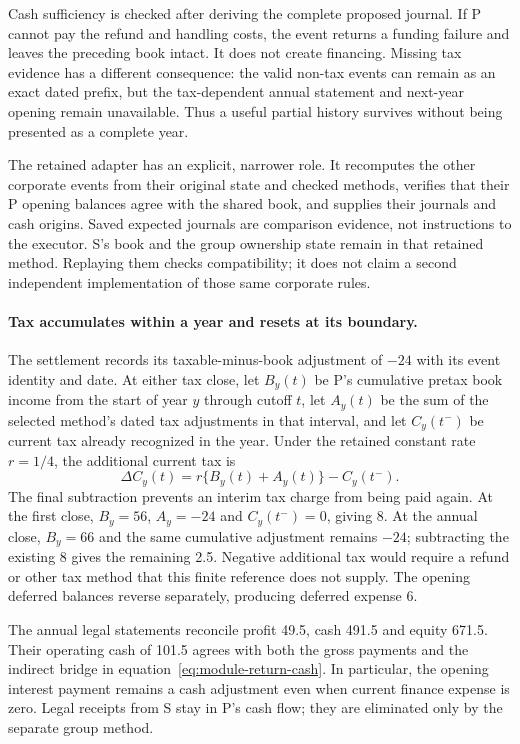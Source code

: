 Cash sufficiency is checked after deriving the complete proposed journal.
If P cannot pay the refund and handling costs, the event returns a funding
failure and leaves the preceding book intact. It does not create financing.
Missing tax evidence has a different consequence: the valid non-tax events
can remain as an exact dated prefix, but the tax-dependent annual statement
and next-year opening remain unavailable. Thus a useful partial history
survives without being presented as a complete year.

The retained adapter has an explicit, narrower role. It recomputes the other
corporate events from their original state and checked methods, verifies that
their P opening balances agree with the shared book, and supplies their
journals and cash origins. Saved expected journals are comparison evidence,
not instructions to the executor. S's book and the group ownership state
remain in that retained method. Replaying them checks compatibility; it does
not claim a second independent implementation of those same corporate rules.

\paragraph{Tax accumulates within a year and resets at its boundary.}
The settlement records its taxable-minus-book adjustment of $-24$ with its
event identity and date. At either tax close, let $B_y(t)$ be P's cumulative
pretax book income from the start of year $y$ through cutoff $t$, let
$A_y(t)$ be the sum of the selected method's dated tax adjustments in that
interval, and let $C_y(t^-)$ be current tax already recognized in the year.
Under the retained constant rate $r=1/4$, the additional current tax is
\begin{equation}
 \Delta C_y(t)=r\{B_y(t)+A_y(t)\}-C_y(t^-).
 \label{eq:return-reference-current-tax}
\end{equation}
The final subtraction prevents an interim tax charge from being paid again.
At the first close, $B_y=56$, $A_y=-24$ and $C_y(t^-)=0$, giving 8. At the
annual close, $B_y=66$ and the same cumulative adjustment remains $-24$;
subtracting the existing 8 gives the remaining 2.5. Negative additional tax
would require a refund or other tax method that this finite reference does
not supply. The opening deferred balances reverse separately, producing
deferred expense 6.

The annual legal statements reconcile profit 49.5, cash 491.5 and equity
671.5. Their operating cash of 101.5 agrees with both the gross payments and
the indirect bridge in equation~\eqref{eq:module-return-cash}. In particular,
the opening interest payment remains a cash adjustment even when current
finance expense is zero. Legal receipts from S stay in P's cash flow; they
are eliminated only by the separate group method.

